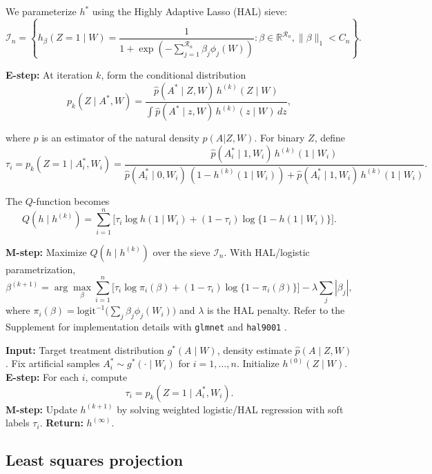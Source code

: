 \documentclass[12pt]{article}
\theoremstyle{thmstyleone}%
\theoremstyle{thmstyletwo}%
\theoremstyle{thmstylethree}%
\begin{document}
We parameterize $h^*$ using the Highly Adaptive Lasso (HAL) sieve:
\[
\mathcal{I}_n = \left\{
h_\beta(Z=1\mid W) = \frac{1}{1+\exp\!\left(-\sum_{j=1}^{\mathcal{R}_n}\beta_j\phi_j(W)\right)}
: \beta\in\mathbb{R}^{\mathcal{R}_n}, \|\beta\|_1< C_n
\right\}.
\]




\textbf{E-step: }At iteration $k$, form the conditional distribution
\[
p_k(Z\mid A^*,W) =
\frac{\hat p(A^*\mid Z,W)\,h^{(k)}(Z\mid W)}
{\int \hat p(A^*\mid z,W)\,h^{(k)}(z\mid W)\,dz},
\]

\noindent where $\hat p$ is an estimator of the natural density $p(A|Z,W)$. For binary $Z$, define
\[
\tau_i = p_k(Z=1\mid A_i^*,W_i)
= \frac{\hat p(A_i^*\mid 1,W_i)\,h^{(k)}(1\mid W_i)}
{\hat p(A_i^*\mid 0,W_i)\,(1-h^{(k)}(1\mid W_i))+\hat p(A_i^*\mid 1,W_i)\,h^{(k)}(1\mid W_i)}.
\]

The $Q$-function becomes
\[
Q(h\mid h^{(k)})
= \sum_{i=1}^n \Big[ \tau_i \log h(1\mid W_i)
+ (1-\tau_i)\log \{1-h(1\mid W_i)\}\Big].
\]

\textbf{M-step: } Maximize $Q(h\mid h^{(k)})$ over the sieve $\mathcal{I}_n$.  
With HAL/logistic parametrization,
\[
\beta^{(k+1)} = \arg\max_\beta
\sum_{i=1}^n \Big[ \tau_i \log \pi_i(\beta) + (1-\tau_i)\log\{1-\pi_i(\beta)\}\Big]
- \lambda \sum_j |\beta_j|,
\]
where $\pi_i(\beta)=\mathrm{logit}^{-1}\big(\sum_j \beta_j\phi_j(W_i)\big)$ and $\lambda$ is the HAL penalty. Refer to the Supplement for implementation details with \texttt{glmnet} and \texttt{hal9001} \citep{hal9001}.



\begin{algorithm}[h!]
	\caption{EM-HAL algorithm for KL projections}
	\label{alg:em}
	\begin{algorithmic}[1]
		\State \textbf{Input:}  {Target treatment distribution} $g^*(A\mid W)$, density estimate $\hat p(A\mid Z,W)$.
		\State Fix artificial samples $A_i^*\sim g^*(\cdot\mid W_i)$ for $i=1,\dots,n$.
		\State Initialize $h^{(0)}(Z\mid W)$.
		\State \textbf{E-step:} For each $i$, compute
		\[
		\tau_i = p_k(Z=1\mid A_i^*,W_i).
		\]
		\State \textbf{M-step:} Update $h^{(k+1)}$ by solving weighted logistic/HAL regression with soft labels $\tau_i$.
		\EndFor
		\State \textbf{Return:} $h^{(\infty)}$.
	\end{algorithmic}
\end{algorithm}



\subsection{Least squares projection}\label{sec:ls}
\end{document}
